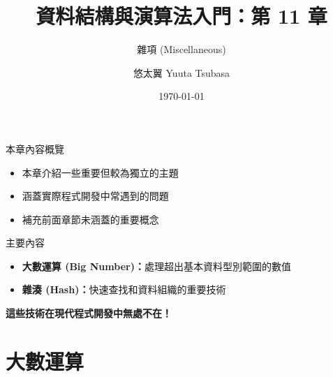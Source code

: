 \documentclass{beamer}
\begin{document}
\title{資料結構與演算法入門：第 11 章}
\subtitle{雜項 (Miscellaneous)}
\author{悠太翼 Yuuta Tsubasa}
\date{\today}

\frame{\titlepage}

\begin{frame}{本章內容概覽}
\begin{itemize}
    \item 本章介紹一些重要但較為獨立的主題
    \item 涵蓋實際程式開發中常遇到的問題
    \item 補充前面章節未涵蓋的重要概念
\end{itemize}

\vspace{1em}
\begin{block}{主要內容}
\begin{itemize}
    \item \textbf{大數運算 (Big Number)：}處理超出基本資料型別範圍的數值
    \item \textbf{雜湊 (Hash)：}快速查找和資料組織的重要技術
\end{itemize}
\end{block}

\vspace{1em}
\begin{center}
\textbf{這些技術在現代程式開發中無處不在！}
\end{center}
\end{frame}

\section{大數運算}
\end{document}

